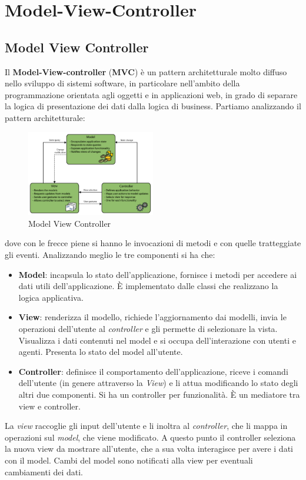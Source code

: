 \chapter{Model-View-Controller}
\section{Model View Controller}
Il \textbf{Model-View-controller} (\textbf{MVC}) è un pattern architetturale
molto diffuso nello sviluppo di sistemi software, in particolare nell'ambito
della programmazione orientata agli oggetti e in applicazioni web, in grado di
separare la logica di presentazione dei dati dalla logica di business. Partiamo
analizzando il pattern architetturale:
\begin{figure}[!ht]
      \centering
      \includegraphics[width=0.5\textwidth]{img/mvc/mvcpattern.png}
      \caption{Model View Controller}
      \label{fig:enter-label}
\end{figure}

dove con le frecce piene si hanno le invocazioni di metodi e con quelle
tratteggiate gli eventi. Analizzando meglio le tre componenti si ha che:
\begin{itemize}
      \item \textbf{Model}: incapsula lo stato dell'applicazione, fornisce i
            metodi per accedere ai dati utili dell'applicazione. È implementato
            dalle classi che realizzano la logica applicativa.
      \item \textbf{View}: renderizza il modello, richiede l'aggiornamento dai
            modelli, invia le operazioni dell'utente al \textit{controller} e
            gli permette di selezionare la vista. Visualizza i dati contenuti
            nel model e si occupa dell'interazione con utenti e agenti. Presenta
            lo stato del model all'utente.
      \item \textbf{Controller}: definisce il comportamento dell'applicazione,
            riceve i comandi dell'utente (in genere attraverso la \textit{View})
            e li attua modificando lo stato degli altri due componenti. Si ha un
            controller per funzionalità. È un mediatore tra view e controller.
\end{itemize}
La \textit{view} raccoglie gli input dell'utente e li inoltra al \textit{controller},
che li mappa in operazioni sul \textit{model}, che viene modificato. A questo
punto il controller seleziona la nuova view da mostrare all'utente, che a sua
volta interagisce per avere i dati con il model. Cambi del model sono notificati
alla view per eventuali cambiamenti dei dati.

